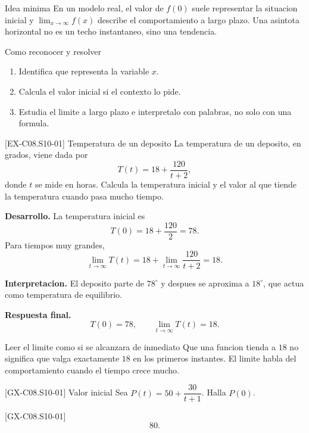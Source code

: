 \begin{theorybox}{Idea minima}
En un modelo real, el valor de \(f(0)\) suele representar la situacion inicial y
\(\lim_{x\to\infty}f(x)\) describe el comportamiento a largo plazo. Una asintota horizontal no
es un techo instantaneo, sino una tendencia.
\end{theorybox}

\begin{methodbox}{Como reconocer y resolver}
\begin{enumerate}
  \item Identifica que representa la variable \(x\).
  \item Calcula el valor inicial si el contexto lo pide.
  \item Estudia el limite a largo plazo e interpretalo con palabras, no solo con una formula.
\end{enumerate}
\end{methodbox}

\begin{solvedexample}{[EX-C08.S10-01] Temperatura de un deposito}
La temperatura de un deposito, en grados, viene dada por
\[
T(t)=18+\frac{120}{t+2},
\]
donde \(t\) se mide en horas. Calcula la temperatura inicial y el valor al que tiende la
temperatura cuando pasa mucho tiempo.

\textbf{Desarrollo.} La temperatura inicial es
\[
T(0)=18+\frac{120}{2}=78.
\]
Para tiempos muy grandes,
\[
\lim_{t\to\infty}T(t)=18+\lim_{t\to\infty}\frac{120}{t+2}=18.
\]

\textbf{Interpretacion.} El deposito parte de \(78^\circ\) y despues se aproxima a
\(18^\circ\), que actua como temperatura de equilibrio.

\textbf{Respuesta final.}
\[
T(0)=78,\qquad \lim_{t\to\infty}T(t)=18.
\]
\end{solvedexample}

\begin{commonerror}{Leer el limite como si se alcanzara de inmediato}
Que una funcion tienda a \(18\) no significa que valga exactamente \(18\) en los primeros
instantes. El limite habla del comportamiento cuando el tiempo crece mucho.
\end{commonerror}

\begin{guidedexercise}{[GX-C08.S10-01] Valor inicial}
Sea \(P(t)=50+\dfrac{30}{t+1}\). Halla \(P(0)\).
\end{guidedexercise}

\begin{shortanswer}{[GX-C08.S10-01]}
\[
80.
\]
\end{shortanswer}


